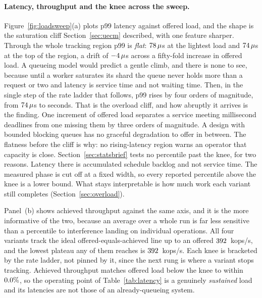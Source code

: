 \documentclass[english,oneside,a4paper,censored,csm,software-track-2020]{HYthesisML}
\begin{document}
\paragraph{Latency, throughput and the knee across the sweep.}
Figure~\ref{fig:loadsweep}(a) plots p99 latency against offered load, and the shape is the
saturation cliff Section~\ref{sec:uecm} described, with one feature sharper. Through the whole
tracking region p99 is \emph{flat}: $78\,\mu$s at the lightest load and
$74\,\mu$s at the top of the region, a drift of
$-4\,\mu$s across a fifty-fold increase in offered load. A queueing model
would predict a gentle climb, and there is none to see, because until a worker saturates its shard
the queue never holds more than a request or two and latency is service time and not waiting
time. Then, in the single step of the rate ladder that follows, p99 rises by four orders of
magnitude, from $74\,\mu$s to seconds. That is the overload cliff, and how abruptly it arrives is the finding. One increment of
offered load separates a service meeting millisecond deadlines from one missing them by three
orders of magnitude. A design with bounded blocking queues has no graceful degradation to offer
in between. The flatness before the cliff is why: no rising-latency region warns an operator that
capacity is close. Section~\ref{sec:statsbrief} tests no percentile past the knee, for two
reasons. Latency there is accumulated schedule backlog and not service time. The measured phase
is cut off at a fixed width, so every reported percentile above the knee is a lower bound. What
stays interpretable is how much work each variant still completes (Section~\ref{sec:overload}).

Panel~(b) shows achieved throughput against the same axis, and it is the more informative of the
two, because an average over a whole run is far less sensitive than a percentile to interference
landing on individual operations. All four variants track the ideal offered-equals-achieved line
up to an offered $392$~kops/s, and the lowest plateau any of them reaches is
$392$~kops/s. Each knee is bracketed by the rate ladder, not pinned by it, since the
next rung is where a variant stops tracking. Achieved throughput matches offered load below the knee
to within $0.0\%$, so the operating point of Table~\ref{tab:latency} is a genuinely
\emph{sustained} load and its latencies are not those of an already-queueing system.
\end{document}
